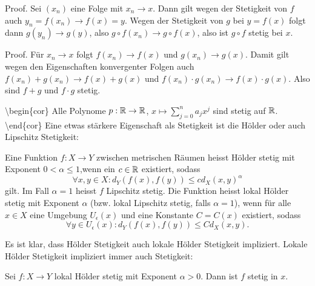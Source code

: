 \begin{emphBox}{}{}
Proof.  Sei \((x_n)\) eine Folge mit \(x_n \rightarrow x\). Dann gilt wegen der Stetigkeit von \(f\) auch \(y_n=f(x_n) \rightarrow f(x) = y\). Wegen der Stetigkeit von \(g\) bei \(y=f(x)\) folgt dann \(g(y_n) \rightarrow g(y)\), also \(g\circ f(x_n) \rightarrow g \circ f(x)\), also ist \(g \circ f\) stetig bei \(x\).
\end{emphBox}
\label{stetigkeit/stetigkeit:theorem-6}
\begin{theorem}{}{}


\end{theorem}

\begin{emphBox}{}{}
Proof.  Für \(x_n \rightarrow x\) folgt \(f(x_n) \rightarrow f(x)\) und \(g(x_n) \rightarrow g(x)\). Damit gilt wegen den Eigenschaften konvergenter Folgen auch \(f(x_n) + g(x_n) \rightarrow f(x) + g(x)\) und
\(f(x_n) \cdot g(x_n) \rightarrow f(x) \cdot g(x)\). Also sind \(f+g\) und \(f \cdot g\) stetig.
\end{emphBox}

\textbackslash{}begin\{cor\}
Alle Polynome \(p: \mathbb{R}  \rightarrow \mathbb{R}\), \( x \mapsto \sum_{j=0}^n a_j x^j\) sind stetig auf \(\mathbb{R}\).
\textbackslash{}end\{cor\}
Eine etwas stärkere Eigenschaft als Stetigkeit ist die Hölder  oder auch Lipschitz Stetigkeit:
\label{stetigkeit/stetigkeit:definition-7}
\begin{definition}{}{}



Eine Funktion \(f: X \rightarrow Y\) zwischen metrischen Räumen heisst Hölder stetig mit Exponent \(0 < \alpha \leq 1\),wenn ein \(c \in \mathbb{R}\) existiert, sodass
\begin{equation*}
 \forall x,y \in X: d_Y(f(x),f(y)) \leq c d_X(x,y)^\alpha
\end{equation*}
gilt. Im Fall \(\alpha = 1\) heisst \(f\) Lipschitz stetig.
Die Funktion heisst lokal Hölder stetig mit Exponent \(\alpha\) (bzw. lokal Lipschitz stetig, falls \(\alpha =1\)), wenn für alle \(x \in X\) eine Umgebung \(U_\epsilon(x)\) und eine Konstante \(C=C(x)\) existiert, sodass
\begin{equation*}
 \forall y \in U_\epsilon(x): d_Y(f(x),f(y)) \leq C d_X(x,y) .
\end{equation*}\end{definition}

Es ist klar, dass Hölder Stetigkeit auch lokale Hölder Stetigkeit impliziert. Lokale Hölder Stetigkeit impliziert immer auch Stetigkeit:
\label{stetigkeit/stetigkeit:theorem-8}
\begin{theorem}{}{}



Sei \(f: X \rightarrow Y\) lokal Hölder stetig mit Exponent \(\alpha > 0\). Dann ist \(f\) stetig in \(x\).
\end{theorem}

